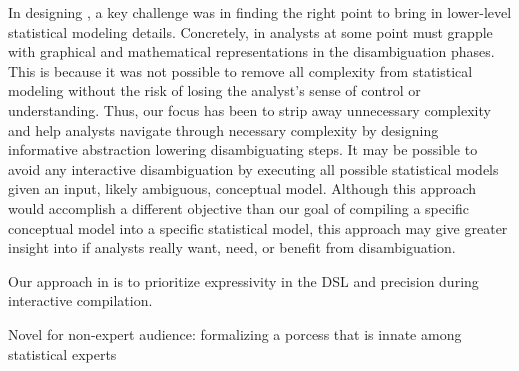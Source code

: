 In designing \rTisane, a key challenge was in finding the right point to bring
in lower-level statistical modeling details. Concretely, in \rTisane analysts at some point must grapple with graphical and
mathematical representations in the disambiguation phases. This is because it
was not possible to remove all complexity from statistical modeling without the
risk of losing the analyst's sense of control or understanding. Thus, our focus
has been to strip away unnecessary complexity and help analysts navigate through
necessary complexity by designing informative abstraction lowering
disambiguating steps. It may be possible to avoid any interactive disambiguation
by executing all possible statistical models given an input, likely ambiguous,
conceptual model. Although this approach would accomplish a different objective
than our goal of compiling a specific conceptual model into a specific
statistical model, this approach may give greater insight into if analysts
really want, need, or benefit from disambiguation. 

Our approach in \rTisane is to
prioritize expressivity in the DSL and precision during interactive compilation. 


Novel for non-expert audience: formalizing a porcess that is innate among statistical experts

